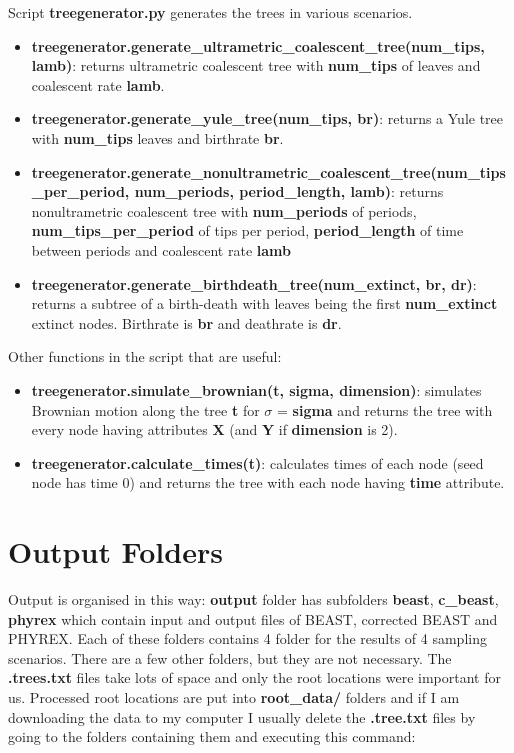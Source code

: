 Script \textbf{treegenerator.py} generates the trees in various scenarios.
\begin{itemize}
\item \textbf{treegenerator.generate\_ultrametric\_coalescent\_tree(num\_tips, lamb)}: returns ultrametric coalescent tree with \textbf{num\_tips} of leaves and coalescent rate \textbf{lamb}.

\item \textbf{treegenerator.generate\_yule\_tree(num\_tips, br)}: returns a Yule tree with \textbf{num\_tips} leaves and birthrate \textbf{br}.

\item \textbf{treegenerator.generate\_nonultrametric\_coalescent\_tree(num\_tips\_per\_period, num\_periods, period\_length, lamb)}: returns nonultrametric coalescent tree with \textbf{num\_periods} of periods, \textbf{num\_tips\_per\_period} of tips per period, \textbf{period\_length} of time between periods and coalescent rate \textbf{lamb}

\item \textbf{treegenerator.generate\_birthdeath\_tree(num\_extinct, br, dr)}: returns a subtree of a birth-death with leaves being the first \textbf{num\_extinct} extinct nodes. Birthrate is \textbf{br} and deathrate is \textbf{dr}.
\end{itemize}

Other functions in the script that are useful:

\begin{itemize}
\item \textbf{treegenerator.simulate\_brownian(t, sigma, dimension)}: simulates Brownian motion along the tree \textbf{t} for $\sigma$ = \textbf{sigma} and returns the tree with every node having attributes \textbf{X} (and \textbf{Y} if \textbf{dimension} is 2).
\item \textbf{treegenerator.calculate\_times(t)}: calculates times of each node (seed node has time 0) and returns the tree with each node having \textbf{time} attribute.

\end{itemize}


\section*{Output Folders}
Output is organised in this way: \textbf{output} folder has subfolders 
\textbf{beast}, \textbf{c\_beast}, \textbf{phyrex} which contain input and output files of BEAST, corrected BEAST and PHYREX. Each of these folders contains 4 folder for the results of 4 sampling scenarios. There are a few other folders, but they are not necessary.
The \textbf{.trees.txt} files take lots of space and only the root locations were important for us. Processed root locations are put into \textbf{root\_data/} folders and if I am downloading the data to my computer I usually delete the \textbf{.tree.txt} files by going to the folders containing them and executing this command:


